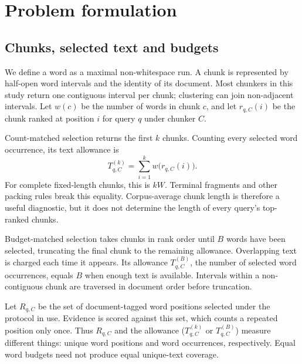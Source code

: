 \documentclass[11pt]{article}
\begin{document}
\section{Problem formulation}\label{sec:problem}
\subsection{Chunks, selected text and budgets}
We define a word as a maximal non-whitespace run. A chunk is represented by half-open word intervals and the identity of its document. Most chunkers in this study return one contiguous interval per chunk; clustering can join non-adjacent intervals. Let $w(c)$ be the number of words in chunk $c$, and let $r_{q,C}(i)$ be the chunk ranked at position $i$ for query $q$ under chunker $C$.

Count-matched selection returns the first $k$ chunks. Counting every selected word occurrence, its text allowance is
\begin{equation}
T^{(k)}_{q,C}=\sum_{i=1}^{k}w\bigl(r_{q,C}(i)\bigr).
\label{eq:countbudget}
\end{equation}
For complete fixed-length chunks, this is $kW$. Terminal fragments and other packing rules break this equality. Corpus-average chunk length is therefore a useful diagnostic, but it does not determine the length of every query's top-ranked chunks.

Budget-matched selection takes chunks in rank order until $B$ words have been selected, truncating the final chunk to the remaining allowance. Overlapping text is charged each time it appears. Its allowance $T^{(B)}_{q,C}$, the number of selected word occurrences, equals $B$ when enough text is available. Intervals within a non-contiguous chunk are traversed in document order before truncation.

Let $R_{q,C}$ be the set of document-tagged word positions selected under the protocol in use. Evidence is scored against this set, which counts a repeated position only once. Thus $R_{q,C}$ and the allowance ($T^{(k)}_{q,C}$ or $T^{(B)}_{q,C}$) measure different things: unique word positions and word occurrences, respectively. Equal word budgets need not produce equal unique-text coverage.
\end{document}
